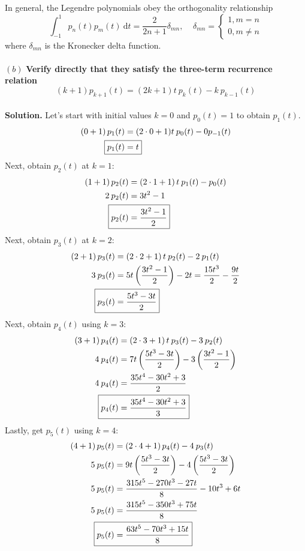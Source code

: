 In general, the Legendre polynomials obey the orthogonality relationship
\begin{equation}
\int_{-1}^{1}p_n(t)p_m(t)\:\mathrm{d}t=\frac{2}{2n+1}\delta_{mn}, \:\:\:\:\: \delta_{mn}=
\begin{cases}
1, m=n\\
0, m\neq n
\end{cases}
\end{equation}
where $\delta_{mn}$ is the Kronecker delta function.
\\
\\
$(b)$ \textbf{Verify directly that they satisfy the three-term recurrence relation}
\begin{equation}
\left(k+1\right) p_{k+1}(t) = \left(2k+1\right)t\:p_k(t) - k\:p_{k-1}(t)
\end{equation}
\\
\textbf{Solution.} Let's start with initial values $k=0$ and $p_0(t)=1$ to obtain $p_1(t)$.
\begin{align*}
\left(0+1\right)p_1(t) &= (2\cdot0+1)t\:p_0(t)-0p_{-1}(t)\\
\Aboxed{p_1(t)&=t}
\end{align*}
Next, obtain $p_2(t)$ at $k=1$:
\begin{align*}
\left(1+1\right)p_2(t) &= \left(2\cdot 1+1\right)t\:p_1(t)- p_0(t)\\
2\:p_2(t) &= 3t^2-1\\
\Aboxed{p_2(t) &= \frac{3t^2-1}{2}}
\end{align*}
Next, obtain $p_3(t)$ at $k=2$:
\begin{align*}
\left(2+1\right)p_3(t) &= \left(2\cdot2+1\right)t\:p_2(t)-2\:p_1(t)\\
3\:p_3(t) &= 5t\left(\frac{3t^2-1}{2}\right)-2t = \frac{15t^3}{2}-\frac{9t}{2}\\
\Aboxed{p_3(t) &= \frac{5t^3-3t}{2}}
\end{align*}
Next, obtain $p_4(t)$ using $k=3$:
\begin{align*}
\left(3+1\right)p_4(t) &= \left(2\cdot 3+1\right)t\:p_3(t)-3\:p_2(t)\\
4\:p_4(t) &= 7t\left(\frac{5t^3-3t}{2}\right)-3\left(\frac{3t^2-1}{2}\right)\\
4\:p_4(t) &= \frac{35t^4-30t^2+3}{2} \\
\Aboxed{p_4(t) &= \frac{35t^4-30t^2+3}{3}}
\end{align*}
Lastly, get $p_5(t)$ using $k=4$:
\begin{align*}
\left(4+1\right)p_5(t) &= \left(2\cdot 4+1\right)p_4(t)-4\:p_3(t)\\
5\:p_5(t) &= 9t\left(\frac{5t^3-3t}{2}\right)-4\left(\frac{5t^3-3t}{2}\right)\\
5\:p_5(t) &= \frac{315t^5-270t^3-27t}{8}-10t^3+6t\\
5\:p_5(t) &= \frac{315t^5-350t^3+75t}{8}\\
\Aboxed{p_5(t) &= \frac{63t^5-70t^3+15t}{8}}
\end{align*}

